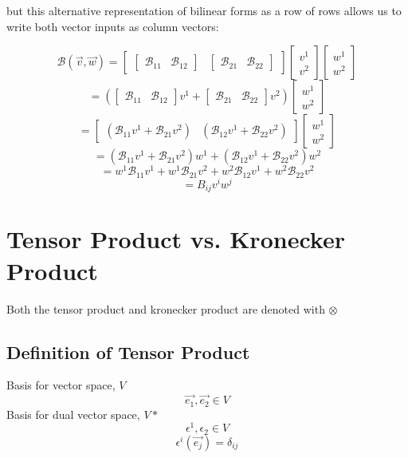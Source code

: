 \documentclass{report}
\begin{document}
but this alternative representation of bilinear forms as a row of rows allows us to write both vector inputs as column vectors:

$$ \mathcal{B}\left( \vec{v}, \vec{w} \right) = \begin{bmatrix} \begin{bmatrix} \mathcal{B}_{11} & \mathcal{B}_{12} \end{bmatrix} & \begin{bmatrix}  \mathcal{B}_{21} & \mathcal{B}_{22}\end{bmatrix}  \end{bmatrix} \begin{bmatrix} v^1 \\ v^2 \end{bmatrix} \begin{bmatrix}  w^1 \\ w^2 \end{bmatrix}  $$ 
$$ =\left( \begin{bmatrix} \mathcal{B}_{11} & \mathcal{B}_{12} \end{bmatrix} v^1  + \begin{bmatrix} \mathcal{B}_{21} & \mathcal{B}_{22} \end{bmatrix} v^2  \right)\begin{bmatrix} w^1 \\ w^2 \end{bmatrix}  $$ 
$$ =\begin{bmatrix} \left( \mathcal{B}_{11}v^1 + \mathcal{B}_{21} v^2 \right) & \left( \mathcal{B}_{12}v^1 + \mathcal{B}_{22}v^2 \right) \end{bmatrix} \begin{bmatrix} w^1 \\ w^2 \end{bmatrix}  $$ 
$$ = \left( \mathcal{B}_{11}v^1 + \mathcal{B}_{21} v^2 \right)w^1 + \left( \mathcal{B}_{12}v^1 + \mathcal{B}_{22}v^2 \right) w^2  $$ 
$$ = w^1 \mathcal{B}_{11}v^1 +w^1 \mathcal{B}_{21} v^2 + w^2 \mathcal{B}_{12}v^1 + w^2\mathcal{B}_{22}v^2 $$ 
$$ = B_{ij} v^i w^j  $$ 

\chapter{Tensor Product vs. Kronecker Product}
Both the tensor product and kronecker product are denoted with $ \otimes$

\section{Definition of Tensor Product}
Basis for vector space, $V$
 $$ \vec{e_1}, \vec{e_2} \in V $$ 
Basis for dual vector space, $V*$
$$ \epsilon^1, \epsilon_{2} \in V $$ 
$$ \epsilon^i \left( \vec{e_j} \right) = \delta_{ij} $$ 
\end{document}
